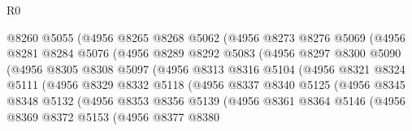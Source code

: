 \begin{lexlean}{R0}
\begin{coremodule}
                      @8260
                      @5055
                      (@4956
                        @8265
                        @8268
                        @5062
                        (@4956
                          @8273
                          @8276
                          @5069
                          (@4956
                            @8281
                            @8284
                            @5076
                            (@4956
                              @8289
                              @8292
                              @5083
                              (@4956
                                @8297
                                @8300
                                @5090
                                (@4956
                                  @8305
                                  @8308
                                  @5097
                                  (@4956
                                    @8313
                                    @8316
                                    @5104
                                    (@4956
                                      @8321
                                      @8324
                                      @5111
                                      (@4956
                                        @8329
                                        @8332
                                        @5118
                                        (@4956
                                          @8337
                                          @8340
                                          @5125
                                          (@4956
                                            @8345
                                            @8348
                                            @5132
                                            (@4956
                                              @8353
                                              @8356
                                              @5139
                                              (@4956
                                                @8361
                                                @8364
                                                @5146
                                                (@4956
                                                  @8369
                                                  @8372
                                                  @5153
                                                  (@4956
                                                    @8377
                                                    @8380

\end{coremodule}
\end{lexlean}
